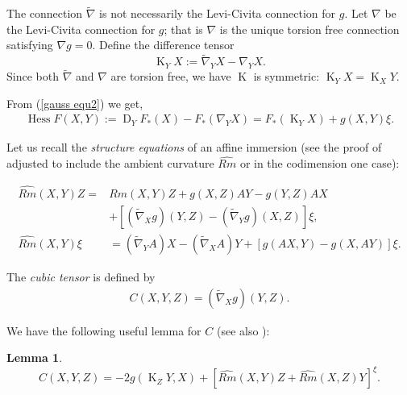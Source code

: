 \documentclass{amsart}
\newtheorem{lemma}[theorem]{Lemma}
\theoremstyle{definition}
\theoremstyle{remark}
\DeclareMathOperator{\hess}{Hess}
\DeclareMathOperator{\diff}{K}
\DeclareMathOperator{\D}{D}
\numberwithin{equation}{section}
\begin{document}
The connection $\tilde{\nabla}$ is not necessarily the Levi-Civita connection for $g$. Let $\nabla$ be the Levi-Civita connection for $g$; that is $\nabla$ is the unique torsion free connection satisfying $\nabla g=0.$ Define the difference tensor
\begin{equation}
\label{eq:difftensor}
\diff_YX := \tilde{\nabla}_{Y}X - \nabla_{Y}X.
\end{equation}
Since both $\tilde{\nabla}$ and $\nabla$ are torsion free, we have $\diff$ is symmetric: $\diff_YX = \diff_XY.$

From (\ref{gauss equ2}) we get,
\begin{align}\label{gauss equ3}
\hess F(X,Y):=\D_YF_{\ast}(X)-F_{\ast}(\nabla_YX) = F_{\ast}(\diff_YX) + g(X,Y)\xi.
\end{align}

Let us recall the \emph{structure equations} of an affine immersion (see the proof of \cite[Section II, Theorem 2.1]{MR1311248} adjusted to include the ambient curvature $\widehat{Rm}$ or \cite[p. 197 equations (N1.6)--(N1.9)]{MR1311248} in the codimension one case):

\begin{align}
\label{eq:structure1}
\widehat{Rm} (X, Y) Z =& Rm(X, Y) Z + g(X, Z) A Y - g(Y, Z)A X \\
&+ \left[(\tilde{\nabla}_X g) (Y, Z) - (\tilde{\nabla}_Y g)( X, Z)\right] \xi \nonumber,\\
\label{eq:structure2}
\widehat{Rm} (X, Y) \xi &= (\tilde{\nabla}_Y A) X - (\tilde{\nabla}_X A) Y + \left[g(AX, Y) - g(X, AY)\right]\xi.
\end{align}

The \emph{cubic tensor} is defined by
\begin{align}
C(X,Y,Z) = (\tilde{\nabla}_X g) (Y,Z).
\end{align}

We have the following useful lemma for $C$ (see also \cite[Section II, Proposition 4.1]{MR1311248}):

\begin{lemma}
\label{lem:cubic_symmetry}
\[
C(X, Y, Z) =  -2g(\diff_Z Y, X) + \left[\widehat{Rm}(X, Y)Z + \widehat{Rm}(X, Z)Y\right]^{\xi}.
\]
\end{lemma}
\end{document}
